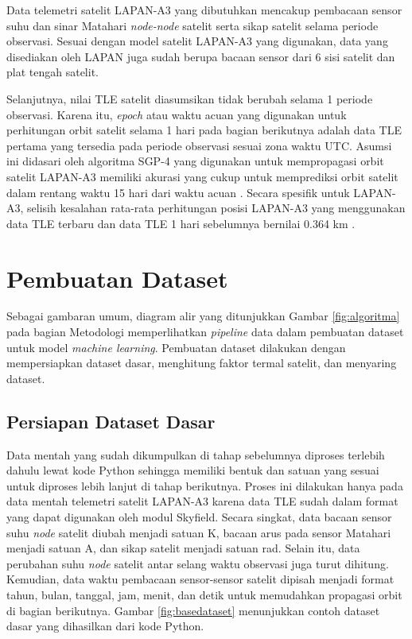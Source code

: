 Data telemetri satelit LAPAN-A3 yang dibutuhkan mencakup pembacaan sensor suhu
dan sinar Matahari \textit{node-node} satelit serta sikap satelit selama
periode observasi. Sesuai dengan model satelit LAPAN-A3 yang digunakan, data
yang disediakan oleh LAPAN juga sudah berupa bacaan sensor dari 6 sisi satelit
dan plat tengah satelit.

Selanjutnya, nilai TLE satelit diasumsikan tidak berubah selama 1 periode
observasi. Karena itu, \textit{epoch} atau waktu acuan yang digunakan untuk
perhitungan orbit satelit selama 1 hari pada bagian berikutnya adalah data TLE
pertama yang tersedia pada periode observasi sesuai zona waktu UTC. Asumsi ini
didasari oleh algoritma SGP-4 yang digunakan untuk mempropagasi orbit satelit
LAPAN-A3 memiliki akurasi yang cukup untuk memprediksi orbit satelit dalam
rentang waktu 15 hari dari waktu acuan \cite{kelsoa}. Secara spesifik untuk
LAPAN-A3, selisih kesalahan rata-rata perhitungan posisi LAPAN-A3 yang
menggunakan data TLE terbaru dan data TLE 1 hari sebelumnya bernilai 0.364 km
\cite{nugroho2018}. 

\section{Pembuatan Dataset}

Sebagai gambaran umum, diagram alir yang ditunjukkan Gambar \ref{fig:algoritma}
pada bagian Metodologi memperlihatkan \textit{pipeline} data dalam pembuatan
dataset untuk model \textit{machine learning}. Pembuatan dataset dilakukan
dengan mempersiapkan dataset dasar, menghitung faktor termal satelit, dan
menyaring dataset.

\subsection{Persiapan Dataset Dasar}

Data mentah yang sudah dikumpulkan di tahap sebelumnya diproses terlebih dahulu
lewat kode Python sehingga memiliki bentuk dan satuan yang sesuai untuk
diproses lebih lanjut di tahap berikutnya. Proses ini dilakukan hanya pada data
mentah telemetri satelit LAPAN-A3 karena data TLE sudah dalam format yang dapat
digunakan oleh modul Skyfield. Secara singkat, data bacaan sensor suhu
\textit{node} satelit diubah menjadi satuan K, bacaan arus pada sensor Matahari
menjadi satuan A, dan sikap satelit menjadi satuan rad. Selain itu, data
perubahan suhu \textit{node} satelit antar selang waktu observasi juga turut
dihitung. Kemudian, data waktu pembacaan sensor-sensor satelit dipisah menjadi
format tahun, bulan, tanggal, jam, menit, dan detik untuk memudahkan propagasi
orbit di bagian berikutnya. Gambar \ref{fig:basedataset} menunjukkan
contoh dataset dasar yang dihasilkan dari kode Python.

